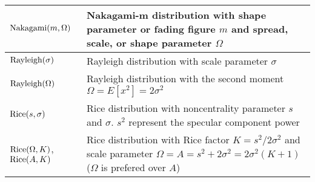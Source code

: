 \begin{xltabular}{\textwidth}{XX}
	\(\textnormal{Nakagami}(m, \Omega)\)                          & Nakagami-m distribution with shape parameter or fading figure \(m\) and spread, scale, or shape parameter \(\Omega\)                                               \\ \hline
	\(\textnormal{Rayleigh}(\sigma)\)                             & Rayleigh distribution with scale parameter \(\sigma\)                                                                                                              \\ \hline
	\(\textnormal{Rayleigh}(\Omega)\)                             & Rayleigh distribution with the second moment \(\Omega = E\left[ x^2 \right] = 2\sigma^2\)                                                                          \\ \hline
	\(\textnormal{Rice}(s, \sigma)\)                              & Rice distribution with noncentrality parameter \cite[p. 841]{proakisDigitalCommunications2007} \(s\) and \(\sigma\). \(s^2\) represent the specular component power \cite[p. 841]{proakisDigitalCommunications2007}                                                \\ \hline
	\(\textnormal{Rice}(\Omega, K)\), \(\textnormal{Rice}(A, K)\) & Rice distribution with Rice factor \(K=s^2/2\sigma^2\) and scale parameter \(\Omega = A = s^2 + 2\sigma^2 = 2\sigma^{2}(K+1)\) (\(\Omega\) is prefered over \(A\))
\end{xltabular}